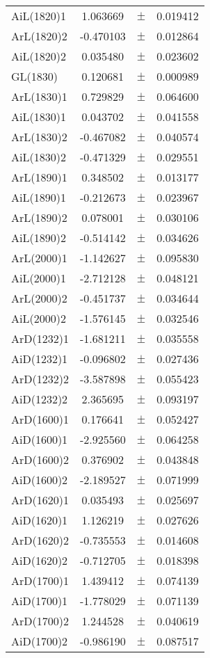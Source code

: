 \begin{table}
\begin{tiny}
\begin{tabular}{lccc}
AiL(1820)1 & 1.063669 & $\pm$ & 0.019412 \\
ArL(1820)2 & -0.470103 & $\pm$ & 0.012864 \\
AiL(1820)2 & 0.035480 & $\pm$ & 0.023602 \\
GL(1830) & 0.120681 & $\pm$ & 0.000989 \\
ArL(1830)1 & 0.729829 & $\pm$ & 0.064600 \\
AiL(1830)1 & 0.043702 & $\pm$ & 0.041558 \\
ArL(1830)2 & -0.467082 & $\pm$ & 0.040574 \\
AiL(1830)2 & -0.471329 & $\pm$ & 0.029551 \\
ArL(1890)1 & 0.348502 & $\pm$ & 0.013177 \\
AiL(1890)1 & -0.212673 & $\pm$ & 0.023967 \\
ArL(1890)2 & 0.078001 & $\pm$ & 0.030106 \\
AiL(1890)2 & -0.514142 & $\pm$ & 0.034626 \\
ArL(2000)1 & -1.142627 & $\pm$ & 0.095830 \\
AiL(2000)1 & -2.712128 & $\pm$ & 0.048121 \\
ArL(2000)2 & -0.451737 & $\pm$ & 0.034644 \\
AiL(2000)2 & -1.576145 & $\pm$ & 0.032546 \\
ArD(1232)1 & -1.681211 & $\pm$ & 0.035558 \\
AiD(1232)1 & -0.096802 & $\pm$ & 0.027436 \\
ArD(1232)2 & -3.587898 & $\pm$ & 0.055423 \\
AiD(1232)2 & 2.365695 & $\pm$ & 0.093197 \\
ArD(1600)1 & 0.176641 & $\pm$ & 0.052427 \\
AiD(1600)1 & -2.925560 & $\pm$ & 0.064258 \\
ArD(1600)2 & 0.376902 & $\pm$ & 0.043848 \\
AiD(1600)2 & -2.189527 & $\pm$ & 0.071999 \\
ArD(1620)1 & 0.035493 & $\pm$ & 0.025697 \\
AiD(1620)1 & 1.126219 & $\pm$ & 0.027626 \\
ArD(1620)2 & -0.735553 & $\pm$ & 0.014608 \\
AiD(1620)2 & -0.712705 & $\pm$ & 0.018398 \\
ArD(1700)1 & 1.439412 & $\pm$ & 0.074139 \\
AiD(1700)1 & -1.778029 & $\pm$ & 0.071139 \\
ArD(1700)2 & 1.244528 & $\pm$ & 0.040619 \\
AiD(1700)2 & -0.986190 & $\pm$ & 0.087517 \\
\bottomrule
\end{tabular}
\end{tiny}
\end{table}

